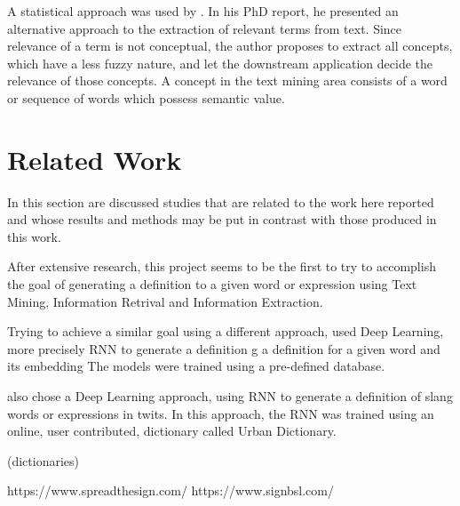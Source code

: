 A statistical approach was used by \textcite{ventura_2014}. 
In his PhD report, he presented an alternative approach to the extraction of relevant terms from text.
Since relevance of a term is not conceptual, the author proposes to extract all concepts, which have a less fuzzy nature, and let the downstream application decide the relevance of those concepts.
A concept in the text mining area consists of a word or sequence of words which possess semantic value.

\section{Related Work}

In this section are discussed studies that are related to the work here reported and whose results and methods may be put in contrast with those produced in this work.

After extensive research, this project seems to be the first to try to accomplish the goal of generating a definition to a given word or expression using Text Mining, Information Retrival and Information Extraction.

Trying to achieve a similar goal using a different approach, \textcite{noraset_2016} used Deep Learning, more precisely \gls{RNN} to generate a definition g a definition for a given word and its embedding
The models were trained using a pre-defined database.

\textcite{ni_2017} also chose a Deep Learning approach, using \gls{RNN} to generate a definition of slang words or expressions in twits.
In this approach, the \gls{RNN} was trained using an online, user contributed, dictionary called Urban Dictionary.

(dictionaries)

https://www.spreadthesign.com/ 
https://www.signbsl.com/



